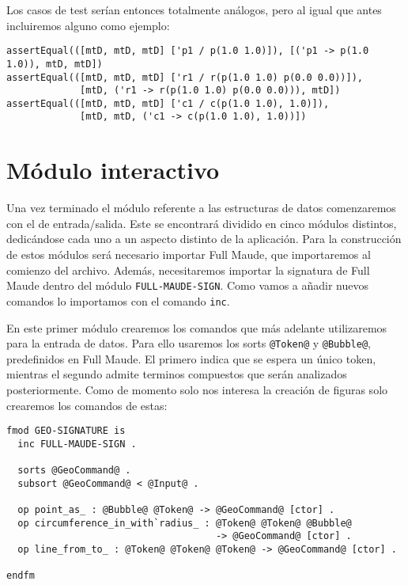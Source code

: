 Los casos de test serían entonces totalmente análogos, pero al igual que antes incluiremos alguno como ejemplo:

{\codesize
\begin{verbatim}
assertEqual(([mtD, mtD, mtD] ['p1 / p(1.0 1.0)]), [('p1 -> p(1.0 1.0)), mtD, mtD])
assertEqual(([mtD, mtD, mtD] ['r1 / r(p(1.0 1.0) p(0.0 0.0))]),
             [mtD, ('r1 -> r(p(1.0 1.0) p(0.0 0.0))), mtD])
assertEqual(([mtD, mtD, mtD] ['c1 / c(p(1.0 1.0), 1.0)]), 
             [mtD, mtD, ('c1 -> c(p(1.0 1.0), 1.0))])
\end{verbatim}
}

\section{Módulo interactivo}

Una vez terminado el módulo referente a las estructuras de datos comenzaremos con el de entrada/salida. Este se encontrará dividido en cinco módulos distintos, dedicándose cada uno a un aspecto distinto de la aplicación. Para la construcción de estos módulos será necesario importar Full Maude, que importaremos al comienzo del archivo. Además, necesitaremos importar la signatura de Full Maude dentro del módulo \verb"FULL-MAUDE-SIGN". Como vamos a añadir nuevos comandos lo importamos con el comando \verb"inc". \par

En este primer módulo crearemos los comandos que más adelante utilizaremos para la entrada de datos. Para ello usaremos los sorts \texttt{@Token@} y \texttt{@Bubble@}, predefinidos en Full Maude. El primero indica que se espera un único token, mientras el segundo admite terminos compuestos que serán analizados posteriormente. Como de momento solo nos interesa la creación de figuras solo crearemos los comandos de estas:\par

{\codesize
\begin{verbatim}
fmod GEO-SIGNATURE is
  inc FULL-MAUDE-SIGN .

  sorts @GeoCommand@ .
  subsort @GeoCommand@ < @Input@ .

  op point_as_ : @Bubble@ @Token@ -> @GeoCommand@ [ctor] .
  op circumference_in_with`radius_ : @Token@ @Token@ @Bubble@ 
                                     -> @GeoCommand@ [ctor] .
  op line_from_to_ : @Token@ @Token@ @Token@ -> @GeoCommand@ [ctor] .

endfm
\end{verbatim}
}

